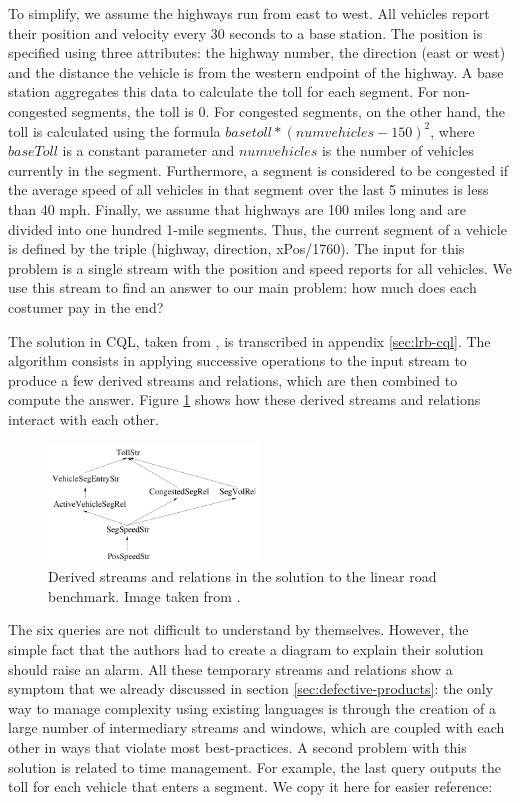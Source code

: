 To simplify, we assume the highways run from east to west. All
vehicles report their position and velocity every 30 seconds to a base
station. The position is specified using three attributes: the highway
number, the direction (east or west) and the distance the vehicle is
from the western endpoint of the highway. A base station aggregates
this data to calculate the toll for each segment. For non-congested
segments, the toll is 0. For congested segments, on the other hand,
the toll is calculated using the formula \(basetoll * (numvehicles -
150)^2\), where \(baseToll\) is a constant parameter and
\(numvehicles\) is the number of vehicles currently in the
segment. Furthermore, a segment is considered to be congested if the
average speed of all vehicles in that segment over the last 5 minutes
is less than 40 mph. Finally, we assume that highways are 100 miles
long and are divided into one hundred 1-mile segments. Thus, the current
segment of a vehicle is defined by the triple (highway, direction,
xPos/1760). The input for this problem is a single stream with the
position and speed reports for all vehicles. We use this stream to
find an answer to our main problem: how much does each costumer pay in
the end?

The solution in CQL, taken from \cite{cql}, is transcribed in appendix
\ref{sec:lrb-cql}. The algorithm consists in applying successive
operations to the input stream to produce a few derived streams and
relations, which are then combined to compute the answer. Figure
\ref{fig:lrb-cql} shows how these derived streams and relations
interact with each other.

\begin{figure} \centering
  \includegraphics[width=0.5\textwidth]{lrb-cql.png}
  \caption{Derived streams and relations in the solution to the linear
    road benchmark. Image taken from \cite{cql}.}
  \label{fig:lrb-cql}
\end{figure}


The six queries are not difficult to understand by
themselves. However, the simple fact that the authors had to create a
diagram to explain their solution should raise an alarm. All these
temporary streams and relations show a symptom that we already
discussed in section \ref{sec:defective-products}: the only way to
manage complexity using existing languages is through the creation of
a large number of intermediary streams and windows, which are coupled
with each other in ways that violate most best-practices. A second
problem with this solution is related to time management. For example,
the last query outputs the toll for each vehicle that enters a
segment. We copy it here for easier reference:

